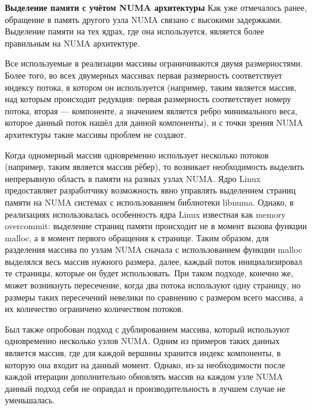 \documentclass[a4paper,10pt]{extarticle}
\begin{document}
\textbf{Выделение памяти с учётом NUMA архитектуры}
Как уже отмечалось ранее, обращение в память другого узла NUMA связано с высокими задержками. Выделение памяти на тех ядрах, где она используется, является более правильным на NUMA архитектуре.


Все используемые в реализации массивы ограничиваются двумя размерностями. Более того, во всех двумерных массивах первая размерность соответствует индексу потока, в котором он используется (например, таким является массив, над которым происходит редукция: первая размерность соответствует номеру потока, вторая --- компоненте, а значением является ребро минимального веса, которое данный поток нашёл для данной компоненты), и с точки зрения NUMA архитектуры такие массивы проблем не создают.


Когда одномерный массив одновременно использует несколько потоков (например,  таким является массив рёбер), то возникает необходимость выделить непрерывную область в памяти на разных узлах NUMA. Ядро Linux предоставляет разработчику возможность явно управлять выделением страниц памяти на NUMA системах с использованием библиотеки libnuma. Однако, в реализациях использовалась особенность ядра Linux известная как memory overcommit: выделение страниц памяти происходит не в момент вызова функции malloc, а в момент первого обращения к странице. Таким образом, для разделения массива по узлам NUMA сначала с использованием функции malloc выделялся весь массив нужного размера, далее, каждый поток инициализировал те страницы, которые он будет использовать. При таком подходе, конечно же, может возникнуть пересечение, когда два потока используют одну страницу, но размеры таких пересечений невелики по сравнению с размером всего массива, а их количество ограничено количеством потоков.

Был также опробован подход с дублированием массива, который используют одновременно несколько узлов NUMA. Одним из примеров таких данных является массив, где для каждой вершины хранится индекс компоненты, в которую она входит на данный момент. Однако, из-за необходимости после каждой итерации дополнительно обновлять массив на каждом узле NUMA данный подход себя не оправдал и производительность в лучшем случае не уменьшалась.
\end{document}

